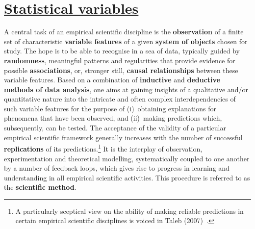 \chapter[Statistical variables]{\href{https://www.youtube.com/watch?v=DXkHcaiRcd4}{Statistical variables}}
A central task of an empirical scientific discipline is the
\textbf{observation} of a  finite set of characteristic
\textbf{variable features} of a given  \textbf{system of objects}
chosen for study. The hope is to be able to recognise in a sea of
data, typically guided by \textbf{randomness}, meaningful patterns
and regularities that provide evidence for possible
\textbf{associations}, or, stronger still, \textbf{causal
relationships} between these variable features. Based on a 
combination of \textbf{inductive} and \textbf{deductive methods of
data analysis}, one aims at gaining insights of a qualitative
and/or quantitative nature into the intricate and often complex 
interdependencies of such variable features for the purpose of 
(i)~obtaining explanations for phenomena that have been observed, 
and (ii)~making predictions which, subsequently, can be tested. 
The acceptance of the validity of a particular empirical 
scientific framework generally increases with the number of 
successful \textbf{replications} of its predictions.\footnote{A 
particularly sceptical view on the ability of making reliable
predictions in certain empirical scientific disciplines is voiced 
in Taleb (2007)~.} It is the interplay of 
observation, experimentation and theoretical modelling, 
systematically coupled to one another by a number of 
feedback loops, which gives rise to progress in learning and 
understanding in all empirical scientific activities. This 
procedure is referred to as the \textbf{scientific method}.

